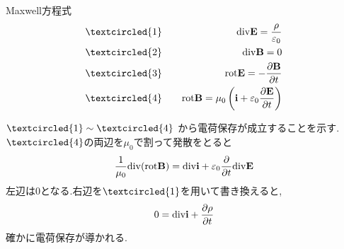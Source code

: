 \documentclass[../main]{subfiles}
\begin{document}
\begin{itembox}[c]{Maxwell方程式}
\begin{eqnarray*}
&\textcircled{\scriptsize 1}& \quad {\rm div}{\bf E}=\frac{\rho}{\varepsilon_0} \\
&\textcircled{\scriptsize 2}& \quad {\rm div}{\bf B}=0 \\
&\textcircled{\scriptsize 3}& \quad {\rm rot}{\bf E}=-\frac{\partial {\bf B}}{\partial t} \\
&\textcircled{\scriptsize 4}& \quad {\rm rot}{\bf B}=\mu_0 \left( {\bf i} + \varepsilon_0 \frac{\partial {\bf E}}{\partial t} \right)
\end{eqnarray*}
\end{itembox}
$\textcircled{\scriptsize 1} \sim \textcircled{\scriptsize 4}$ から電荷保存が成立することを示す. \\
$\textcircled{\scriptsize 4}$の両辺を$\mu_0$で割って発散をとると
\begin{eqnarray*}
\frac{1}{\mu_0} {\rm div}({\rm rot}{\bf B}) = {\rm div}{\bf i} + \varepsilon_0 \frac{\partial}{\partial t} {\rm div}{\bf E}
\end{eqnarray*}
左辺は0となる.右辺を$\textcircled{\scriptsize 1}$を用いて書き換えると,
\begin{eqnarray*}
0 = {\rm div}{\bf i} + \frac{\partial \rho}{\partial t}
\end{eqnarray*}
確かに電荷保存が導かれる. \\
\end{document}
